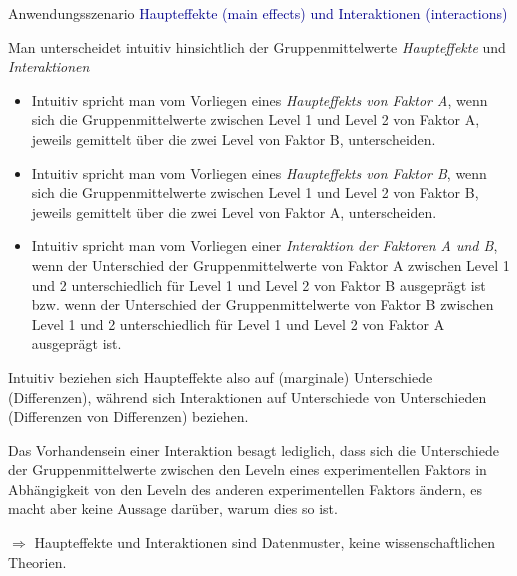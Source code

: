\documentclass[
  8pt,
  ignorenonframetext,
]{beamer}
\providecommand{\tightlist}{%
  \setlength{\itemsep}{0pt}\setlength{\parskip}{0pt}}
\begin{document}
\begin{frame}{Anwendungsszenario}
\protect\hypertarget{anwendungsszenario-5}{}
\textcolor{darkblue}{Haupteffekte (main effects) und Interaktionen (interactions)}
\small

Man unterscheidet intuitiv hinsichtlich der Gruppenmittelwerte
\emph{Haupteffekte} und \emph{Interaktionen}

\footnotesize

\begin{itemize}
\tightlist
\item
  \justifying Intuitiv spricht man vom Vorliegen eines
  \emph{Haupteffekts von Faktor A}, wenn sich die Gruppenmittelwerte
  zwischen Level 1 und Level 2 von Faktor A, jeweils gemittelt über die
  zwei Level von Faktor B, unterscheiden.
\item
  Intuitiv spricht man vom Vorliegen eines \emph{Haupteffekts von Faktor
  B}, wenn sich die Gruppenmittelwerte zwischen Level 1 und Level 2 von
  Faktor B, jeweils gemittelt über die zwei Level von Faktor A,
  unterscheiden.
\item
  Intuitiv spricht man vom Vorliegen einer \emph{Interaktion der
  Faktoren A und B}, wenn der Unterschied der Gruppenmittelwerte von
  Faktor A zwischen Level 1 und 2 unterschiedlich für Level 1 und Level
  2 von Faktor B ausgeprägt ist bzw. wenn der Unterschied der
  Gruppenmittelwerte von Faktor B zwischen Level 1 und 2 unterschiedlich
  für Level 1 und Level 2 von Faktor A ausgeprägt ist.
\end{itemize}

\small

Intuitiv beziehen sich Haupteffekte also auf (marginale) Unterschiede
(Differenzen), während sich Interaktionen auf Unterschiede von
Unterschieden (Differenzen von Differenzen) beziehen.

Das Vorhandensein einer Interaktion besagt lediglich, dass sich die
Unterschiede der Gruppenmittelwerte zwischen den Leveln eines
experimentellen Faktors in Abhängigkeit von den Leveln des anderen
experimentellen Faktors ändern, es macht aber keine Aussage darüber,
warum dies so ist.

\flushright

\(\Rightarrow\) Haupteffekte und Interaktionen sind Datenmuster, keine
wissenschaftlichen Theorien.
\end{frame}
\end{document}
